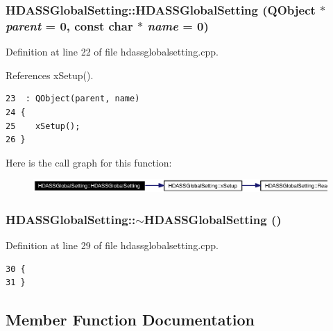 \subsubsection{\setlength{\rightskip}{0pt plus 5cm}HDASSGlobal\-Setting::HDASSGlobal\-Setting (QObject $\ast$ {\em parent} = 0, const char $\ast$ {\em name} = 0)}\label{classHDASSGlobalSetting_HDASSGlobalSettinga0}




Definition at line 22 of file hdassglobalsetting.cpp.

References x\-Setup().



\footnotesize\begin{verbatim}23  : QObject(parent, name)
24 {
25    xSetup();
26 }
\end{verbatim}\normalsize 


Here is the call graph for this function:\begin{figure}[H]
\begin{center}
\leavevmode
\includegraphics[width=329pt]{classHDASSGlobalSetting_HDASSGlobalSettinga0_cgraph}
\end{center}
\end{figure}
\subsubsection{\setlength{\rightskip}{0pt plus 5cm}HDASSGlobal\-Setting::$\sim${\bf HDASSGlobal\-Setting} ()}\label{classHDASSGlobalSetting_HDASSGlobalSettinga1}




Definition at line 29 of file hdassglobalsetting.cpp.



\footnotesize\begin{verbatim}30 {
31 }
\end{verbatim}\normalsize 


\subsection{Member Function Documentation}
